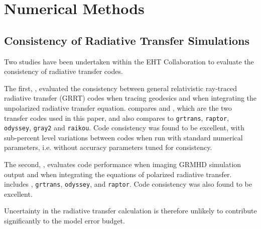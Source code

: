 \section{Numerical Methods}\label{app:numerical}

\subsection{Consistency of Radiative Transfer Simulations}\label{app:radtrans}


Two studies have been undertaken within the EHT Collaboration to evaluate the consistency of radiative transfer codes. 

The first, \citet{2020ApJ...897..148G}, evaluated the consistency between general relativistic ray-traced radiative transfer (GRRT) codes when tracing geodesics and when integrating the unpolarized radiative transfer equation.  \citeauthor{2020ApJ...897..148G} compares \bhoss and \ipole, which are the two transfer codes used in this paper, and  also compares to {\tt grtrans}, {\tt raptor}, {\tt odyssey}, {\tt gray2} and {\tt raikou}.  Code consistency was found to be excellent, with sub-percent level variations between codes when run with standard numerical parameters, i.e. without accuracy parameters tuned for consistency.

The second, \citet{Prather_et_al_2022}, evaluates code performance when imaging GRMHD simulation output and when integrating the equations of polarized radiative transfer.  \citeauthor{Prather_et_al_2022} includes \ipole, {\tt grtrans}, {\tt odyssey}, and {\tt raptor}.  Code consistency was also found to be excellent.

Uncertainty in the radiative transfer calculation is therefore unlikely to contribute significantly to the model error budget.  

